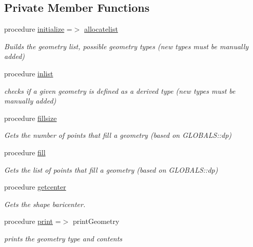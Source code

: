 \subsection*{Private Member Functions}
\begin{DoxyCompactItemize}
\item 
procedure \mbox{\hyperlink{structgeometry__mod_1_1geometry__class_a97a9a90ff4143d41fe57eb0e6d1c76a1}{initialize}} =$>$ \mbox{\hyperlink{namespacegeometry__mod_a1b6f259b0b6be71e02ffae7670f7d8ba}{allocatelist}}
\begin{DoxyCompactList}\small\item\em Builds the geometry list, possible geometry types (new types must be manually added) \end{DoxyCompactList}\item 
procedure \mbox{\hyperlink{structgeometry__mod_1_1geometry__class_a6dfcc19f822da875bebc58c3bf26e999}{inlist}}
\begin{DoxyCompactList}\small\item\em checks if a given geometry is defined as a derived type (new types must be manually added) \end{DoxyCompactList}\item 
procedure \mbox{\hyperlink{structgeometry__mod_1_1geometry__class_a75f5a37d0b38c8baf66ee5089ea44d7a}{fillsize}}
\begin{DoxyCompactList}\small\item\em Gets the number of points that fill a geometry (based on G\+L\+O\+B\+A\+L\+S\+::dp) \end{DoxyCompactList}\item 
procedure \mbox{\hyperlink{structgeometry__mod_1_1geometry__class_a0afee5607f0e2443a862741e40794368}{fill}}
\begin{DoxyCompactList}\small\item\em Gets the list of points that fill a geometry (based on G\+L\+O\+B\+A\+L\+S\+::dp) \end{DoxyCompactList}\item 
procedure \mbox{\hyperlink{structgeometry__mod_1_1geometry__class_a691891378a677185f2f13e736f68ff11}{getcenter}}
\begin{DoxyCompactList}\small\item\em Gets the shape baricenter. \end{DoxyCompactList}\item 
procedure \mbox{\hyperlink{structgeometry__mod_1_1geometry__class_afbb83bea5cd3f73708b448d3c732ea7c}{print}} =$>$ print\+Geometry
\begin{DoxyCompactList}\small\item\em prints the geometry type and contents \end{DoxyCompactList}\end{DoxyCompactItemize}
